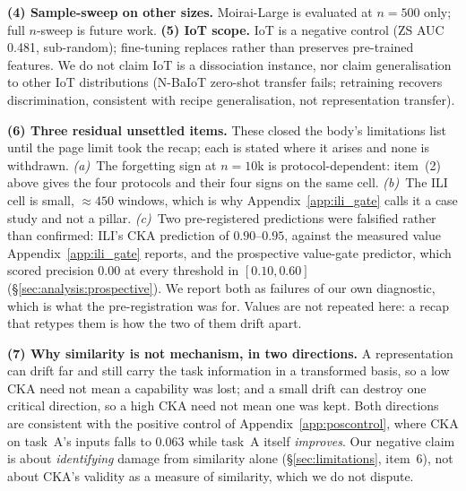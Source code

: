 \textbf{(4) Sample-sweep on other sizes.}
Moirai-Large is evaluated at $n{=}500$ only; full $n$-sweep is future work.
\textbf{(5) IoT scope.}
IoT is a negative control (ZS AUC 0.481, sub-random); fine-tuning replaces
rather than preserves pre-trained features.
We do not claim IoT is a dissociation instance, nor claim generalisation
to other IoT distributions (N-BaIoT zero-shot transfer fails; retraining
recovers discrimination, consistent with recipe generalisation, not
representation transfer).

\textbf{(6) Three residual unsettled items.}  These closed the body's limitations
list until the page limit took the recap; each is stated where it arises and none
is withdrawn.  \emph{(a)}~The forgetting sign at $n{=}10$k is protocol-dependent:
item~(2) above gives the four protocols and their four signs on the same cell.
\emph{(b)}~The ILI cell is small, ${\approx}450$ windows, which is why
Appendix~\ref{app:ili_gate} calls it a case study and not a pillar.  \emph{(c)}~Two
pre-registered predictions were falsified rather than confirmed: ILI's CKA
prediction of $0.90$--$0.95$, against the measured value
Appendix~\ref{app:ili_gate} reports, and the prospective value-gate predictor, which
scored precision $0.00$ at every threshold in $[0.10, 0.60]$
(\S\ref{sec:analysis:prospective}).  We report both as failures of our own
diagnostic, which is what the pre-registration was for.  Values are not repeated
here: a recap that retypes them is how the two of them drift apart.

\textbf{(7) Why similarity is not mechanism, in two directions.}  A representation
can drift far and still carry the task information in a transformed basis, so a
low CKA need not mean a capability was lost; and a small drift can destroy one
critical direction, so a high CKA need not mean one was kept.  Both directions are
consistent with the positive control of Appendix~\ref{app:poscontrol}, where CKA
on task~A's inputs falls to $0.063$ while task~A itself \emph{improves}.  Our
negative claim is about \emph{identifying} damage from similarity alone
(\S\ref{sec:limitations}, item~6), not about CKA's validity as a measure of
similarity, which we do not dispute.

